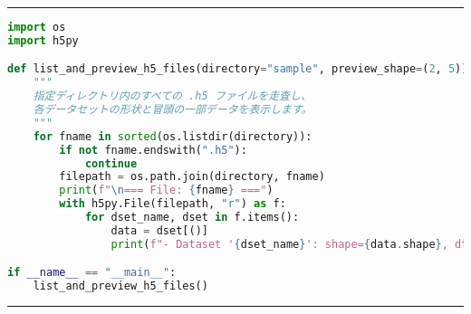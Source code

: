 \documentclass[a4paper,11pt]{article}
\begin{document}
\vspace{5ex}\hrule\vspace{1ex}
\begin{lstlisting}[language=Python, caption={HDF5ファイル読み込み関数}, label={lst:list_h5}]
import os
import h5py

def list_and_preview_h5_files(directory="sample", preview_shape=(2, 5)):
    """
    指定ディレクトリ内のすべての .h5 ファイルを走査し、
    各データセットの形状と冒頭の一部データを表示します。
    """
    for fname in sorted(os.listdir(directory)):
        if not fname.endswith(".h5"):
            continue
        filepath = os.path.join(directory, fname)
        print(f"\n=== File: {fname} ===")
        with h5py.File(filepath, "r") as f:
            for dset_name, dset in f.items():
                data = dset[()]
                print(f"- Dataset '{dset_name}': shape={data.shape}, dtype={data.dtype}")

if __name__ == "__main__":
    list_and_preview_h5_files()
\end{lstlisting}
\vspace{1ex}\hrule\vspace{1ex}

\newpage
\end{document}

